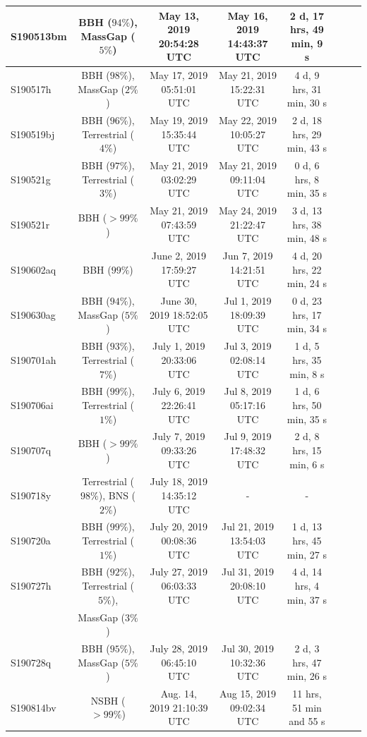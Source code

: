 \begin{table}
{\begin{tabular}{l*{6}{c}r}
S190513bm & BBH ($94\%$), MassGap ($5\%$) & May 13, 2019 20:54:28 UTC & 
May 16, 2019 14:43:37 UTC & 2 d, 17 hrs, 49 min, 9 s \\
\hline
S190517h & BBH ($98\%$), MassGap ($2\%$) & May 17, 2019 05:51:01 UTC & 
May 21, 2019 15:22:31 UTC & 4 d, 9 hrs, 31 min, 30 s \\
\hline 
S190519bj & BBH ($96\%$), Terrestrial ($4\%$) & May 19, 2019 15:35:44 UTC 
& May 22, 2019 10:05:27 UTC & 2 d, 18 hrs, 29 min, 43 s \\
\hline 
S190521g & BBH ($97\%$), Terrestrial ($3\%$) & May 21, 2019 03:02:29 UTC
& May 21, 2019 09:11:04 UTC & 0 d, 6 hrs, 8 min, 35 s \\
\hline 
S190521r & BBH ($>99\%$) & May 21, 2019 07:43:59 UTC & 
May 24, 2019 21:22:47 UTC & 3 d, 13 hrs, 38 min, 48 s \\ 
\hline 
S190602aq & BBH ($99\%$) & June 2, 2019 17:59:27 UTC & 
Jun 7, 2019 14:21:51 UTC & 4 d, 20 hrs, 22 min, 24 s \\
\hline
S190630ag & BBH ($94\%$), MassGap ($5\%$) & June 30, 2019 18:52:05 UTC 
& Jul 1, 2019 18:09:39 UTC & 0 d, 23 hrs, 17 min, 34 s \\
\hline
S190701ah & BBH ($93\%$), Terrestrial ($7\%$) & 
July 1, 2019 20:33:06 UTC & Jul 3, 2019 02:08:14 UTC & 1 d, 5 hrs, 
35 min, 8 s \\ 
\hline
S190706ai & BBH ($99\%$), Terrestrial ($1\%$) & 
July 6, 2019 22:26:41 UTC & Jul 8, 2019 05:17:16 UTC & 1 d, 6 hrs, 50 min, 
35 s \\
\hline
S190707q & BBH ($>99\%$) & July 7, 2019 09:33:26 UTC & 
Jul 9, 2019 17:48:32 UTC & 2 d, 8 hrs, 15 min, 6 s \\
\hline
S190718y & Terrestrial ($98\%$), BNS ($2\%$) & July 18, 2019 14:35:12 UTC 
& - & - \\
\hline
S190720a & BBH ($99\%$), Terrestrial ($1\%$) & July 20, 2019 00:08:36 UTC & 
Jul 21, 2019 13:54:03 UTC & 1 d, 13 hrs, 45 min, 27 s \\
\hline
S190727h & BBH ($92\%$), Terrestrial ($5\%$), & July 27, 2019 06:03:33 UTC
& Jul 31, 2019 20:08:10 UTC & 4 d, 14 hrs, 4 min, 37 s \\
& MassGap ($3\%$) & & & \\
\hline
S190728q & BBH ($95\%$), MassGap ($5\%$) & July 28, 2019 06:45:10 UTC & 
Jul 30, 2019 10:32:36 UTC & 2 d, 3 hrs, 47 min, 26 s \\
\hline
S190814bv & NSBH ($>99\%$) & Aug. 14, 2019 21:10:39 UTC & 
Aug 15, 2019 09:02:34 UTC & 11 hrs, 51 min and 55 s \\

\end{tabular}}
\end{table}
